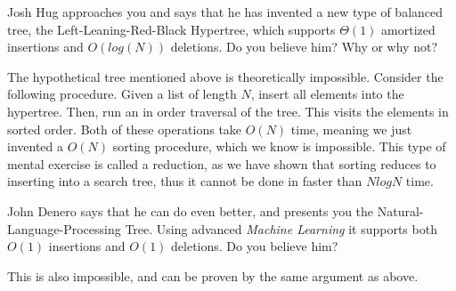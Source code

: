 \begin{blocksection}
\begin{parts}
\item Josh Hug approaches you and says that he has invented a new type of balanced tree, the Left-Leaning-Red-Black Hypertree, which supports $\Theta(1)$ amortized insertions and $O(log(N))$ deletions. Do you believe him? Why or why not?

\begin{solution}[2in]
The hypothetical tree mentioned above is theoretically impossible. Consider the following procedure. Given a list of length $N$, insert all elements into the hypertree. Then, run an in order traversal of the tree. This visits the elements in sorted order. Both of these operations take $O(N)$ time, meaning we just invented a $O(N)$ sorting procedure, which we know is impossible. This type of mental exercise is called a reduction, as we have shown that sorting reduces to inserting into a search tree, thus it cannot be done in faster than $NlogN$ time.
\end{solution}

\item John Denero says that he can do even better, and presents you the Natural-Language-Processing Tree. Using advanced \textit{Machine Learning} it supports both $O(1)$ insertions and $O(1)$ deletions. Do you believe him?

\begin{solution}[2in]
This is also impossible, and can be proven by the same argument as above.
\end{solution}
\end{parts}
\end{blocksection}